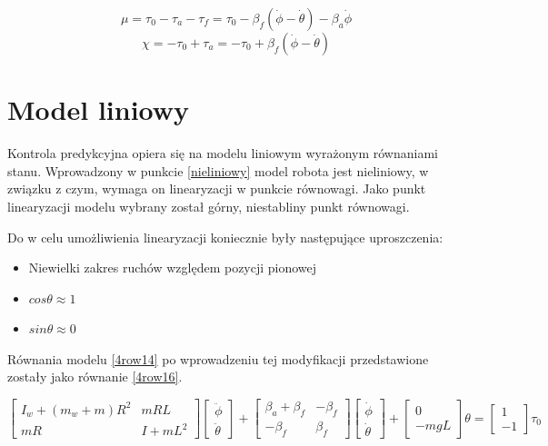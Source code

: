 \begin{equation}
\label{4row14} 
\mu=\tau_0-\tau_a-\tau_f = \tau_0 -\beta_f(\dot{\phi}-\dot{\theta})-\beta_a\dot{\phi}
\end{equation}
\begin{equation}
\label{4row15} 
\chi=-\tau_0+\tau_a=-\tau_0+\beta_f(\dot{\phi}-\dot{\theta})
\end{equation}







\section{Model liniowy}

Kontrola predykcyjna opiera się na modelu liniowym wyrażonym równaniami stanu. Wprowadzony w punkcie \ref{nieliniowy} model robota jest nieliniowy, w związku z czym, wymaga on linearyzacji w punkcie równowagi. Jako punkt linearyzacji modelu wybrany został górny, niestabliny punkt równowagi.

Do w celu umożliwienia linearyzacji koniecznie były następujące uproszczenia:
\begin{itemize}
	\item  Niewielki zakres ruchów względem pozycji pionowej 
	\item  $cos\theta \approx 1$
	\item  $sin\theta \approx 0$
\end{itemize}

Równania modelu \ref{4row14} po wprowadzeniu tej modyfikacji przedstawione zostały jako równanie \ref{4row16}.

\begin{equation}
\label{4row16} 
\begin{bmatrix} {I_w+(m_w+m)R^2} & {mRL} \\{mR} & {I+mL^2} \end{bmatrix}
\begin{bmatrix}	\ddot{\phi}  \\	\ddot{\theta}  \end{bmatrix} +
\begin{bmatrix}	\beta_a + \beta_f &-\beta_f \\	-\beta_f &\beta_f \end{bmatrix} 
\begin{bmatrix}	\dot{\phi}  \\	\dot{\theta} \end{bmatrix} +
\begin{bmatrix}	{0}  \\	{-mgL}  \end{bmatrix}\theta =
\begin{bmatrix}	{1}  \\	{-1} \end{bmatrix}  \tau_0
\end{equation}


